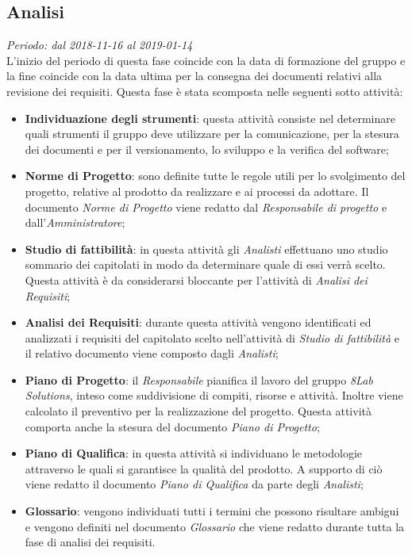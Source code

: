 \subsection{Analisi}
\textit{Periodo: dal 2018-11-16 al 2019-01-14}\\
L'inizio del periodo di questa fase coincide con la data di formazione del 
gruppo e la fine coincide con la data ultima per la consegna dei documenti relativi alla 
revisione dei requisiti. Questa fase è stata scomposta nelle seguenti sotto attività:
\begin{itemize}
	\item \textbf{Individuazione degli strumenti}: questa attività consiste nel 
	determinare quali strumenti il gruppo deve utilizzare per la comunicazione, per 
la stesura dei documenti e per il versionamento, lo sviluppo e la verifica del 
software; 
	\item \textbf{Norme di Progetto}: sono definite tutte le regole utili per lo svolgimento del progetto, relative al prodotto da realizzare e ai processi da adottare. Il documento \textit{Norme di Progetto} viene redatto dal \textit{Responsabile di progetto} e dall'\textit{Amministratore};
	\item \textbf{Studio di fattibilità}: in questa attività gli \textit{Analisti} effettuano uno studio sommario dei capitolati in modo da determinare quale di essi verrà scelto. Questa attività è da considerarsi bloccante per l'attività di \textit{Analisi dei Requisiti};
	\item \textbf{Analisi dei Requisiti}: durante questa attività vengono 
	identificati ed analizzati i requisiti del capitolato scelto nell'attività 
	di \textit{Studio di fattibilità} e il relativo documento viene composto dagli \textit{Analisti};
	\item \textbf{Piano di Progetto}: il \textit{Responsabile} pianifica il 
	lavoro del gruppo \textit{8Lab Solutions}, inteso come suddivisione di compiti, 
	risorse e attività. Inoltre viene calcolato il preventivo per la realizzazione 
	del progetto. Questa attività comporta anche la stesura 
	del documento \textit{Piano di Progetto};
	\item \textbf{Piano di Qualifica}: in questa attività si individuano le 
	metodologie attraverso le quali si garantisce la qualità del prodotto. A supporto di ciò viene redatto il documento \textit{Piano di Qualifica} da parte degli \textit{Analisti}; 
	\item \textbf{Glossario}: vengono individuati tutti i termini che possono risultare ambigui e 
	vengono definiti nel documento \textit{Glossario} che viene 
	redatto durante tutta la fase di analisi dei requisiti.
\end{itemize}

